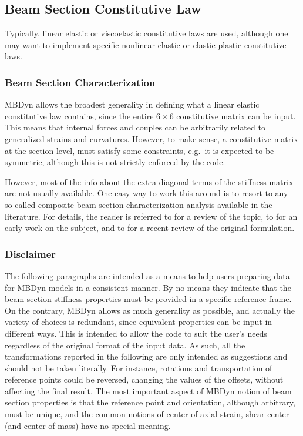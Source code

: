\subsection{Beam Section Constitutive Law}
Typically, linear elastic or viscoelastic constitutive laws are used,
although one may want to implement specific nonlinear elastic
or elastic-plastic constitutive laws.



\subsubsection{Beam Section Characterization}
MBDyn allows the broadest generality in defining what a linear elastic 
constitutive law contains, since the entire $6\times{6}$ constitutive
matrix can be input.
This means that internal forces and couples can be arbitrarily related
to generalized strains and curvatures.
However, to make sense, a constitutive matrix at the section level,
must satisfy some constraints, e.g.\ it is expected to be symmetric, 
although this is not strictly enforced by the code.

However, most of the info about the extra-diagonal terms 
of the stiffness matrix are not usually available.
One easy way to work this around is to resort to any so-called
composite beam section characterization analysis available 
in the literature.
For details, the reader is referred to \cite{HODGES-REVIEW90} 
for a review of the topic, to \cite{ANBA-GIAVOTTO-83}
for an early work on the subject, and to \cite{MASARATI-2001}
for a recent review of the original formulation.


\subsubsection{Disclaimer}
The following paragraphs are intended as a means to help users
preparing data for MBDyn models in a consistent manner.
By no means they indicate that the beam section stiffness properties
must be provided in a specific reference frame.
On the contrary, MBDyn allows as much generality as possible,
and actually the variety of choices is redundant, since equivalent
properties can be input in different ways.
This is intended to allow the code to suit the user's needs
regardless of the original format of the input data.
As such, all the transformations reported in the following 
are only intended as suggestions and should not be taken literally.
For instance, rotations and transportation of reference points
could be reversed, changing the values of the offsets, without
affecting the final result.
The most important aspect of MBDyn notion of beam section properties
is that the reference point and orientation, although arbitrary,
must be unique, and the common notions of center of axial strain,
shear center (and center of mass) have no special meaning.



